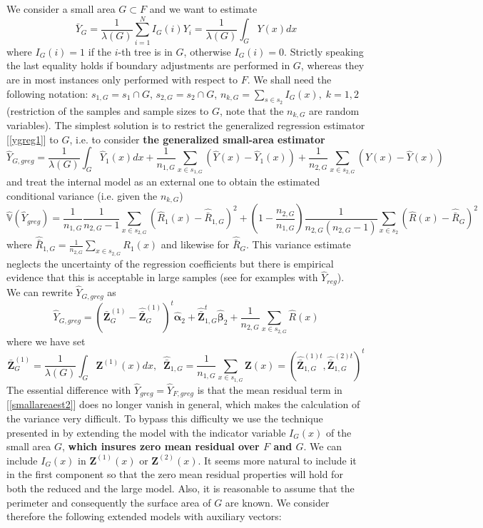 \documentclass[a4paper,12pt,leqno, titlepage]{article}
\newcommand{\VAR}{\mathbb{V}}
\begin{document}
{We consider a small area $G\subset F$ and we want to estimate
$$\bar{Y}_G=\frac{1}{\lambda(G)}\sum_{i=1}^NI_G(i)Y_i=\frac{1}{\lambda(G)}\int_G Y(x)dx$$
where $I_G(i)=1 $ if the $i$-th tree is in $G$, otherwise $I_G(i)=0$. Strictly speaking the last equality holds if boundary adjustments are performed in $G$, whereas they are in most instances only performed with respect to $F$. We shall need the following notation: $s_{1,G}=s_1\cap G$, $s_{2,G}=s_2 \cap G$, $n_{k,G}=\sum_{s\in{s_2}}I_G(x), \;k=1,2$ (restriction of the samples and sample sizes to $G$, note that the $n_{k,G}$ are random variables). The simplest solution is to restrict the generalized regression estimator [\ref{ygreg1}] to $G$, i.e. to consider \textbf{the generalized small-area estimator}
\begin{equation}\label{smallareaest1}
\hat{Y}_{G,greg}=\frac{1}{\lambda(G)}\int_G \hat{Y}_1(x)dx+
\frac{1}{n_{1,G}}\sum_{x\in{s_{1,G}}}(\hat{Y}(x)-\hat{Y}_1(x))+
\frac{1}{n_{2,G}}\sum_{x\in{s_{2,G}}}(Y(x)-\hat{Y}(x))
\end{equation}
 and treat the internal model as an external one to obtain the estimated conditional variance (i.e. given the $n_{k,G}$)
 \begin{equation}\label{extsmallareaestvariance1}
 \hat{\VAR}(\hat{Y}_{greg})=\frac{1}{n_{1,G}}\frac{1}{n_{2,G}-1}\sum_{x\in{s}_{2,G}}
 (\hat{R}_1(x)-\hat{\bar{R}}_{1,G})^2
+ (1-\frac{n_{2,G}}{n_{1,G}})
\frac{1}{n_{2,G}(n_{2,G}-1)}\sum_{x\in{s_2}}(\hat{R}(x)-\hat{\bar{R}}_G)^2
\end{equation}
where $\hat{\bar{R}}_{1,G}=\frac{1}{n_{2,G}}\sum_{x\in{s_{2,G}}}R_1(x)$ and likewise for $\hat{\bar{R}}_G$. This variance estimate neglects the uncertainty of the regression coefficients but there is empirical evidence that this is acceptable in large samples (see \cite{mandallazreport1} for examples with $\hat{Y}_{reg}$).\\
We can rewrite $\hat{Y}_{G,greg}$ as
\begin{equation}\label{smallareaest2}
\hat{Y}_{G,greg}=(\bar{\pmb{Z}}_G^{(1)}-\hat{\bar{\pmb{Z}}}_G^{(1)})^t\hat{\pmb{\alpha}}_2
+\hat{\bar{\pmb{Z}}}^t_{1,G}\hat{\pmb{\beta}}_2+\frac{1}{n_{2,G}}\sum_{x\in{s}_{2,G}}\hat{R}(x)
\end{equation}
where we have set
$$\bar{\pmb{Z}}_G^{(1)}=\frac{1}{\lambda(G)}\int_G \pmb{Z}^{(1)}(x)dx,\;\;
\hat{\bar{\pmb{Z}}}_{1,G}=\frac{1}{n_{1,G}}\sum_{x\in{s}_{1,G}}\pmb{Z}(x)
=(\hat{\bar{\pmb{Z}}}^{(1)t}_{1,G},\hat{\bar{\pmb{Z}}}^{(2)t}_{1,G})^t$$
The essential difference with $\hat{Y}_{greg}=\hat{Y}_{F,greg}$ is that the mean residual term in [\ref{smallareaest2}] does no longer vanish in general, which makes the calculation of the variance very difficult. To bypass this difficulty we use the technique presented in \cite{mandallazreport1} by extending the model with the indicator variable $I_G(x)$ of the small area $G$, \textbf{which insures zero mean residual over $F$ and $G$}. We can include $I_G(x)$ in $\pmb{Z}^{(1)}(x)$ or $\pmb{Z}^{(2)}(x)$. It seems more natural to include it in the first component so that the zero mean residual properties will hold for both the reduced and the large model. Also, it is reasonable to assume that the perimeter and consequently the surface area of $G$ are known. We consider therefore the following extended models with auxiliary vectors:
}
\end{document}
